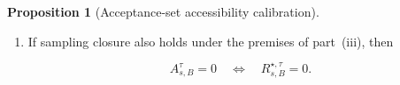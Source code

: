 \documentclass[10pt]{article} %
\renewcommand{\eqref}[1]{\textup{(\ref{#1})}}
\providecommand{\1}{\mathbf{1}}  %
\theoremstyle{remark}
\theoremstyle{definition}
\newtheorem{proposition}{Proposition}[section]
\begin{document}
\begin{proposition}[Acceptance-set accessibility calibration]
\begin{enumerate}[label=(\roman*),itemsep=3pt,topsep=3pt]
Define

\begin{equation}
\Psi_{\tau,s,B}(c)
:=
\inf\!\left\{
r\in[0,1]:
h_2(r)
+
\overline\Omega_{\tau,s,B}(r)
\geq c
\right\}.
\label{eq:accessibility-inverse-modulus}
\end{equation}

For every $c>0$ for which the set in Equation~\eqref{eq:accessibility-inverse-modulus} is nonempty,

\begin{equation}
\Psi_{\tau,s,B}(c)>0,
\end{equation}

and

\begin{equation}
A_{s,B}^{\tau}\geq c
\quad\Longrightarrow\quad
R_{s,B}^{\star,\tau}
\geq
\Psi_{\tau,s,B}(c)
>0.
\label{eq:open-accessibility-error-floor}
\end{equation}

\item If sampling closure also holds under the premises of part~(iii), then

\begin{equation}
A_{s,B}^{\tau}=0
\quad\Longleftrightarrow\quad
R_{s,B}^{\star,\tau}=0.
\label{eq:zero-accessibility-equivalence}
\end{equation}

\end{enumerate}

\end{proposition}
\end{document}
